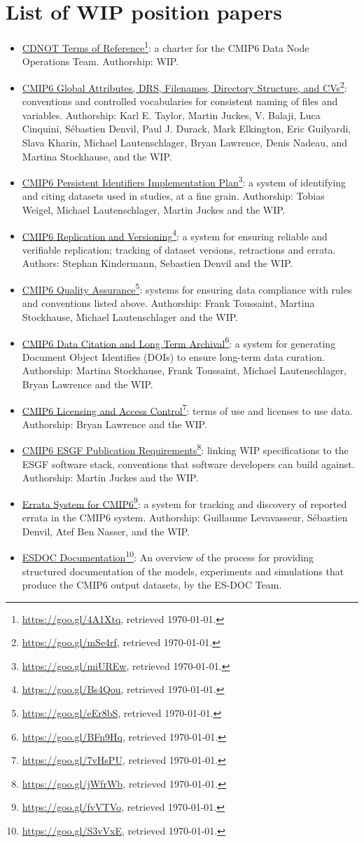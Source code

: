 \documentclass[gmd,manuscript]{copernicus}
\newcommand{\urlref}[2] {\href{#1}{#2}\footnote{\url{#1}, retrieved \today.}}
\begin{document}
\appendix

\section{List of WIP position papers}
\label{sec:wip}


\begin{itemize}
\item \urlref{https://goo.gl/4A1Xtq}{CDNOT Terms of Reference}: a
  charter for the CMIP6 Data Node Operations Team. Authorship: WIP.
\item \urlref{https://goo.gl/mSe4rf}{CMIP6 Global Attributes, DRS,
    Filenames, Directory Structure, and CVs}: conventions and
  controlled vocabularies for consistent naming of files and
  variables. Authorship: Karl E. Taylor, Martin Juckes, V. Balaji,
  Luca Cinquini, Sébastien Denvil, Paul J. Durack, Mark Elkington,
  Eric Guilyardi, Slava Kharin, Michael Lautenschlager, Bryan
  Lawrence, Denis Nadeau, and Martina Stockhause, and the WIP.
\item \urlref{https://goo.gl/miUREw}{CMIP6 Persistent Identifiers
    Implementation Plan}: a system of identifying and citing datasets
  used in studies, at a fine grain. Authorship: Tobias Weigel, Michael
  Lautenschlager, Martin Juckes and the WIP.
\item \urlref{https://goo.gl/Bs4Qou}{CMIP6 Replication and Versioning}:
  a system for ensuring reliable and verifiable replication; tracking
  of dataset versions, retractions and errata. Authors: Stephan
  Kindermann, Sebastien Denvil and the WIP.
\item \urlref{https://goo.gl/eEr8bS}{CMIP6 Quality Assurance}: systems
  for ensuring data compliance with rules and conventions listed
  above. Authorship: Frank Toussaint, Martina Stockhause, Michael
  Lautenschlager and the WIP.
\item \urlref{https://goo.gl/BFn9Hq}{CMIP6 Data Citation and Long Term
    Archival}: a system for generating Document Object Identifies
  (DOIs) to ensure long-term data curation. Authorship: Martina
  Stockhause, Frank Toussaint, Michael Lautenschlager, Bryan Lawrence
  and the WIP.
\item \urlref{https://goo.gl/7vHsPU}{CMIP6 Licensing and Access
    Control}: terms of use and licenses to use data. Authorship: Bryan
  Lawrence and the WIP.
\item \urlref{https://goo.gl/jWfrWb}{CMIP6 ESGF Publication
    Requirements}: linking WIP specifications to the ESGF software
  stack, conventions that software developers can build against.
  Authorship: Martin Juckes and the WIP.
\item \urlref{https://goo.gl/fvVTVo}{Errata System for CMIP6}: a system
  for tracking and discovery of reported errata in the CMIP6 system.
  Authorship: Guillaume Levavasseur, Sébastien Denvil, Atef Ben
  Nasser, and the WIP.
\item \urlref{https://goo.gl/S3vVxE}{ESDOC Documentation}: An overview
  of the process for providing structured documentation of the models,
  experiments and simulations that produce the CMIP6 output datasets,
  by the ES-DOC Team.
\end{itemize}
\end{document}
